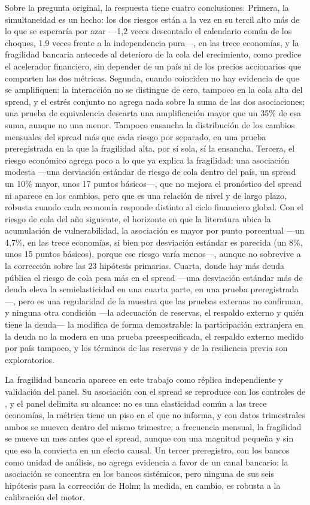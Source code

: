 Sobre la pregunta original, la respuesta tiene cuatro conclusiones. Primera, la simultaneidad es un hecho: los dos riesgos están a la vez en su tercil alto más de lo que se esperaría por azar ---1,2 veces descontado el calendario común de los choques, 1,9 veces frente a la independencia pura---, en las trece economías, y la fragilidad bancaria antecede al deterioro de la cola del crecimiento, como predice el acelerador financiero, sin depender de un país ni de los precios accionarios que comparten las dos métricas. Segunda, cuando coinciden no hay evidencia de que se amplifiquen: la interacción no se distingue de cero, tampoco en la cola alta del spread, y el estrés conjunto no agrega nada sobre la suma de las dos asociaciones; una prueba de equivalencia descarta una amplificación mayor que un 35\% de esa suma, aunque no una menor. Tampoco ensancha la distribución de los cambios mensuales del spread más que cada riesgo por separado, en una prueba preregistrada en la que la fragilidad alta, por sí sola, sí la ensancha. Tercera, el riesgo económico agrega poco a lo que ya explica la fragilidad: una asociación modesta ---una desviación estándar de riesgo de cola dentro del país, un spread un 10\% mayor, unos 17 puntos básicos---, que no mejora el pronóstico del spread ni aparece en los cambios, pero que es una relación de nivel y de largo plazo, robusta cuando cada economía responde distinto al ciclo financiero global. Con el riesgo de cola del año siguiente, el horizonte en que la literatura ubica la acumulación de vulnerabilidad, la asociación es mayor por punto porcentual ---un 4,7\%, en las trece economías, si bien por desviación estándar es parecida (un 8\%, unos 15 puntos básicos), porque ese riesgo varía menos---, aunque no sobrevive a la corrección sobre las 23 hipótesis primarias. Cuarta, donde hay más deuda pública el riesgo de cola pesa más en el spread ---una desviación estándar más de deuda eleva la semielasticidad en una cuarta parte, en una prueba preregistrada---, pero es una regularidad de la muestra que las pruebas externas no confirman, y ninguna otra condición ---la adecuación de reservas, el respaldo externo y quién tiene la deuda--- la modifica de forma demostrable: la participación extranjera en la deuda no la modera en una prueba preespecificada, el respaldo externo medido por país tampoco, y los términos de las reservas y de la resiliencia previa son exploratorios.

La fragilidad bancaria aparece en este trabajo como réplica independiente y validación del panel. Su asociación con el spread se reproduce con los controles de \citet{Chari2024b}, y el panel delimita su alcance: no es una elasticidad común a las trece economías, la métrica tiene un piso en el que no informa, y con datos trimestrales ambos se mueven dentro del mismo trimestre; a frecuencia mensual, la fragilidad se mueve un mes antes que el spread, aunque con una magnitud pequeña y sin que eso la convierta en un efecto causal. Un tercer preregistro, con los bancos como unidad de análisis, no agrega evidencia a favor de un canal bancario: la asociación se concentra en los bancos sistémicos, pero ninguna de sus seis hipótesis pasa la corrección de Holm; la medida, en cambio, es robusta a la calibración del motor.


